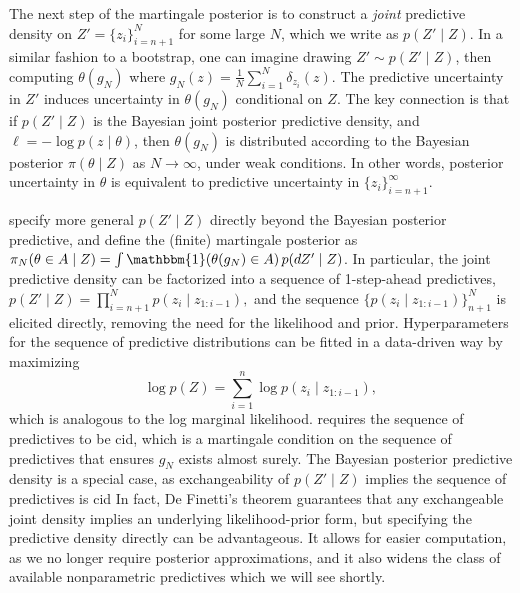 The next step of the martingale posterior is to construct a \emph{joint} predictive density on $Z' = \{z_i\}_{i=n+1}^N$ for some large $N$, which we write as $p(Z' \mid Z)$. In a similar fashion to a bootstrap, one can imagine drawing $Z' \sim p(Z' \mid Z)$, then computing $\theta(g_N)$ where $g_N(z) = \frac{1}{N} \sum_{i=1}^N \delta_{z_i} (z)$. %
The predictive uncertainty in $Z'$ induces uncertainty in $\theta(g_N)$ conditional on $Z$. The key connection is that  if $p(Z' \mid Z)$ is the Bayesian joint  posterior predictive density, and $\ell = - \log p(z \mid \theta)$, then $\theta(g_N)$ is distributed according to the Bayesian posterior $\pi(\theta \mid Z)$ as $N \to \infty$, under weak conditions. In other words, posterior uncertainty in $\theta$ is equivalent to predictive uncertainty in $\{z_i\}_{i=n+1}^\infty$. 

\cite{fong2021martingale} specify more general  $p(Z' \mid Z)$ directly beyond the Bayesian posterior predictive, and define the (finite) martingale posterior 
as 
$\pi_N(\theta \in A \mid Z) = \int \mathbbm{1}(\theta(g_N) \in A) \, p(dZ' \mid Z)$. In particular, the joint predictive density can be factorized into a sequence of 1-step-ahead predictives, 
$
p(Z' \mid Z) = \prod_{i=n+1}^N p(z_i \mid z_{1:i-1}),
$
and the sequence $\{p(z_i \mid z_{1:i-1})\}_{n+1}^N$ is elicited directly, removing the need for the likelihood and prior. Hyperparameters for the sequence of predictive distributions can be fitted in a data-driven way by maximizing 
$$\log p(Z) = \sum_{i=1}^n \log p(z_i \mid z_{1:i-1}),$$ 
which is analogous to the log marginal likelihood.  \cite{fong2021martingale} requires the sequence of predictives to be \gls{cid}, which is a martingale condition on the sequence of predictives that ensures $g_N$ exists almost surely. The Bayesian posterior predictive density is a special case, as exchangeability of $p(Z' \mid Z)$ implies the sequence of predictives is \gls{cid} In fact, De Finetti's theorem \citep{de1937prevision} guarantees that any exchangeable joint density implies an underlying likelihood-prior form, but specifying the predictive density directly can be advantageous. It allows for  easier computation, as we no longer require posterior approximations, and it also widens the class of available nonparametric predictives which we will see shortly.  


